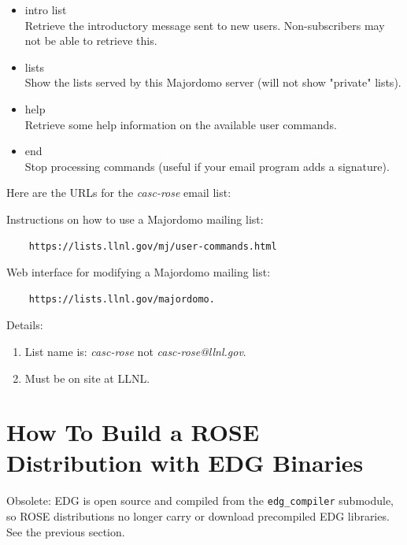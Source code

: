{\begin{itemize}
   \item intro list \\
    Retrieve the introductory message sent to new users. Non-subscribers may not be able
    to retrieve this.

   \item lists \\
    Show the lists served by this Majordomo server (will not show "private" lists).

   \item help \\
    Retrieve some help information on the available user commands.

   \item end \\
    Stop processing commands (useful if your email program adds a signature). 
\end{itemize}


Here are the URLs for the {\em casc-rose} email list:

Instructions on how to use a Majordomo mailing list: \\
\begin{verbatim}
    https://lists.llnl.gov/mj/user-commands.html
\end{verbatim}

Web interface for modifying a Majordomo mailing list: \\
\begin{verbatim}
    https://lists.llnl.gov/majordomo.
\end{verbatim}

Details: \\
\begin{enumerate}
   \item List name is: {\em casc-rose} not {\em casc-rose@llnl.gov}.
   \item Must be on site at LLNL.
\end{enumerate}

}


\section{How To Build a ROSE Distribution with EDG Binaries}%

   Obsolete: EDG is open source and compiled from the {\tt edg\_compiler} submodule, so ROSE
   distributions no longer carry or download precompiled EDG libraries. See the previous section.

